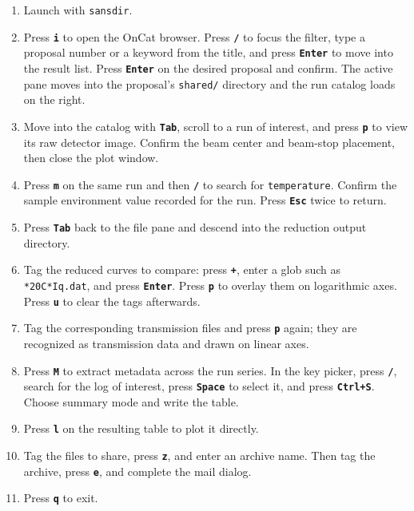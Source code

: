\documentclass[tm]{ornltm}
\newcommand{\key}[1]{\textbf{\texttt{#1}}}
\begin{document}
\begin{enumerate}
  \item Launch with \texttt{sansdir}.
  \item Press \key{i} to open the OnCat browser. Press \key{/} to focus the
    filter, type a proposal number or a keyword from the title, and press
    \key{Enter} to move into the result list. Press \key{Enter} on the desired
    proposal and confirm. The active pane moves into the proposal's
    \texttt{shared/} directory and the run catalog loads on the right.
  \item Move into the catalog with \key{Tab}, scroll to a run of interest, and
    press \key{p} to view its raw detector image. Confirm the beam center and
    beam-stop placement, then close the plot window.
  \item Press \key{m} on the same run and then \key{/} to search for
    \texttt{temperature}. Confirm the sample environment value recorded for the
    run. Press \key{Esc} twice to return.
  \item Press \key{Tab} back to the file pane and descend into the reduction
    output directory.
  \item Tag the reduced curves to compare: press \key{+}, enter a glob such as
    \texttt{*20C*Iq.dat}, and press \key{Enter}. Press \key{p} to overlay them on
    logarithmic axes. Press \key{u} to clear the tags afterwards.
  \item Tag the corresponding transmission files and press \key{p} again; they
    are recognized as transmission data and drawn on linear axes.
  \item Press \key{M} to extract metadata across the run series. In the key
    picker, press \key{/}, search for the log of interest, press \key{Space} to
    select it, and press \key{Ctrl+S}. Choose summary mode and write the table.
  \item Press \key{l} on the resulting table to plot it directly.
  \item Tag the files to share, press \key{z}, and enter an archive name. Then
    tag the archive, press \key{e}, and complete the mail dialog.
  \item Press \key{q} to exit.
\end{enumerate}

\backmatter
\end{document}
